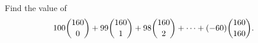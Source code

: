 Find the value of
\[100\dbinom{160}{0}+99\dbinom{160}{1}+98\dbinom{160}{2}+\cdots+(-60)\dbinom{160}{160}.\]
